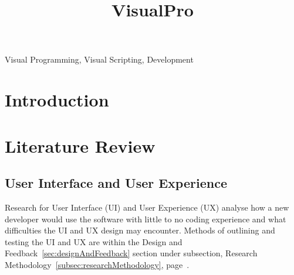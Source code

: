 \documentclass[conference]{IEEEtran}
\begin{document}
	\title{VisualPro}

	\author{
	}

     \maketitle
    
    \thispagestyle{plain}
    \pagestyle{plain}
    
    \tableofcontents
	  \vspace{.5cm}
    \begin{abstract}
    
    \end{abstract}

    \begin{IEEEkeywords}
        Visual Programming, Visual Scripting, Development
    \end{IEEEkeywords}

    \section{Introduction}

    \section{Literature Review}
    \label{sec:literatureReview}
      \subsection{User Interface and User Experience}
      \label{subsec:userInterfaceUserExperience}
        Research for User Interface (UI) and User Experience (UX) analyse how a new developer would use the software with little to no coding experience and what difficulties the UI and UX design may encounter. Methods of outlining and testing the UI and UX are within the Design and Feedback~\ref{sec:designAndFeedback} section under subsection, Research Methodology~\ref{subsec:researchMethodology}, page~\pageref{subsec:researchMethodology}.
\end{document}
